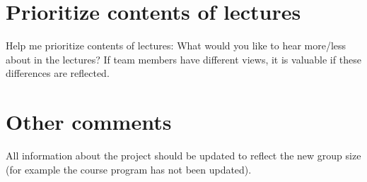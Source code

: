 \documentclass[a4paper]{article}
\begin{document}
	\section{Prioritize contents of lectures}
	Help me prioritize contents of lectures:
What would you like to hear more/less about in the lectures?
If team members have different views, it is valuable if these differences are
reflected.

	\section{Other comments}
	All information about the project should be updated to reflect the new group size (for example the course program has not been updated).
\end{document}
